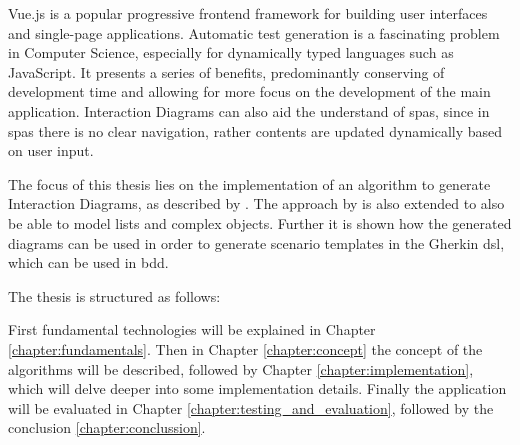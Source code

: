 Vue.js \parencite{vuejs_gh} is a popular progressive frontend framework for building user interfaces and single-page applications. Automatic test generation is a fascinating problem in Computer Science, especially for dynamically typed languages such as JavaScript. It presents a series of benefits, predominantly conserving of development time and allowing for more focus on the development of the main application. Interaction Diagrams can also aid the understand of \glspl{spa}, since in \glspl{spa} there is no clear navigation, rather contents are updated dynamically based on user input. 

The focus of this thesis lies on the implementation of an algorithm to generate Interaction Diagrams, as described by \textcite{zhang2019scenario}. The approach by \textcite{zhang2019scenario} is also  extended to also be able to model lists and complex objects. Further it is shown how the generated diagrams can be used in order to generate scenario templates in the Gherkin \gls{dsl}, which can be used in \gls{bdd}.


The thesis is structured as follows:

First fundamental technologies will be explained in Chapter \ref{chapter:fundamentals}. Then in Chapter \ref{chapter:concept} the concept of the algorithms will be described, followed by Chapter \ref{chapter:implementation}, which will delve deeper into some implementation details. Finally the application will be evaluated in Chapter \ref{chapter:testing_and_evaluation},
followed by the conclusion \ref{chapter:conclussion}.